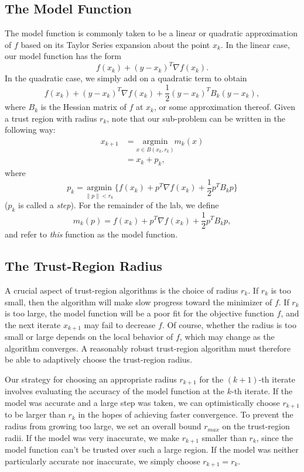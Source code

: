 \subsection*{The Model Function}
The model function is commonly taken to be a linear or quadratic approximation of
$f$ based on its Taylor Series expansion about the point $x_k$. In the linear case,
our model function has the form
\[
f(x_k) + (y-x_k)^T \nabla f(x_k).
\]
In the quadratic case, we simply add on a quadratic term to obtain
\[
f(x_k) + (y-x_k)^T \nabla f(x_k) + \frac{1}{2}(y - x_k)^T B_k (y-x_k),
\]
where $B_k$ is the Hessian matrix of $f$ at $x_k$, or some approximation thereof.
Given a trust region with radius $r_k$, note that our sub-problem can be
written in the following way:
\begin{align*}
x_{k+1} &= \underset{x \in B(x_k, r_k)}{\text{argmin}} m_k(x)\\
&= x_k + p_k,
\end{align*}
where
\begin{equation}
p_k = \underset{\|p\| < r_k}{\text{argmin}}\, \{f(x_k) + p^T \nabla f(x_k) + \frac{1}{2}p^T B_k p\}
\label{eq:step}
\end{equation}
($p_k$ is called a \emph{step}).
For the remainder of the lab, we define
\[
m_k(p) = f(x_k) + p^T \nabla f(x_k) + \frac{1}{2}p^T B_k p,
\]
and refer to \emph{this} function as the model function.

\subsection*{The Trust-Region Radius}
A crucial aspect of trust-region algorithms is the choice of radius $r_k$. If $r_k$ is too small, then the algorithm will
make slow progress toward the minimizer of $f$. If $r_k$ is too large, the model function will be a poor fit for the objective
function $f$, and the next iterate $x_{k+1}$ may fail to decrease $f$.
Of course, whether the radius is too small or large depends on the local behavior of $f$, which may change as the algorithm
converges. A reasonably robust trust-region algorithm must therefore be able to adaptively choose the trust-region radius.

Our strategy for choosing an appropriate radius $r_{k+1}$ for the $(k+1)$-th iterate involves evaluating the accuracy
of the model function at the $k$-th iterate. If the model was accurate and a large step was taken, we can optimistically choose $r_{k+1}$ to be larger
than $r_k$ in the hopes of achieving faster convergence.
To prevent the radius from growing too large, we set an overall bound $r_{max}$ on the trust-region radii.
If the model was very inaccurate, we make $r_{k+1}$ smaller than
$r_k$, since the model function can't be trusted over such a large region. If the model was neither particularly accurate
nor inaccurate, we simply choose $r_{k+1} = r_k$.

